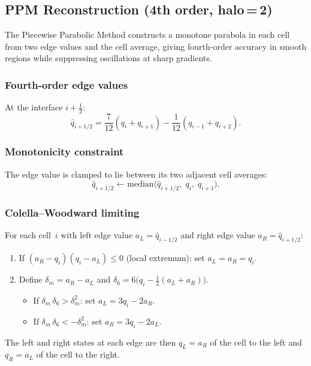 \documentclass[11pt,a4paper]{article}
\newcommand{\half}{\tfrac{1}{2}}
\begin{document}
\subsection{PPM Reconstruction (4th order, halo\,=\,2)}

The Piecewise Parabolic Method \citep{ColellaWoodward1984} constructs a monotone parabola in each cell from two edge values and the cell average, giving fourth-order accuracy in smooth regions while suppressing oscillations at sharp gradients.

\subsubsection{Fourth-order edge values}
At the interface $i\!+\!\half$:
\begin{equation}
  \hat q_{i+1/2} = \frac{7}{12}(q_i+q_{i+1}) - \frac{1}{12}(q_{i-1}+q_{i+2}).
\end{equation}

\subsubsection{Monotonicity constraint}
The edge value is clamped to lie between its two adjacent cell averages:
\begin{equation}
  \hat q_{i+1/2} \leftarrow \mathrm{median}\!\bigl(\hat q_{i+1/2},\;q_i,\;q_{i+1}\bigr).
\end{equation}

\subsubsection{Colella--Woodward limiting}
For each cell~$i$ with left edge value $a_L=\hat q_{i-1/2}$ and right edge value $a_R=\hat q_{i+1/2}$:
\begin{enumerate}[nosep]
  \item If $(a_R-q_i)(q_i-a_L)\le 0$ (local extremum): set $a_L=a_R=q_i$.
  \item Define $\delta_m=a_R-a_L$ and $\delta_6=6\bigl(q_i-\half(a_L+a_R)\bigr)$.
  \begin{itemize}[nosep]
    \item If $\delta_m\,\delta_6>\delta_m^2$: set $a_L=3q_i-2a_R$.
    \item If $\delta_m\,\delta_6<-\delta_m^2$: set $a_R=3q_i-2a_L$.
  \end{itemize}
\end{enumerate}
The left and right states at each edge are then $q_L=a_R$ of the cell to the left and $q_R=a_L$ of the cell to the right.
\end{document}
